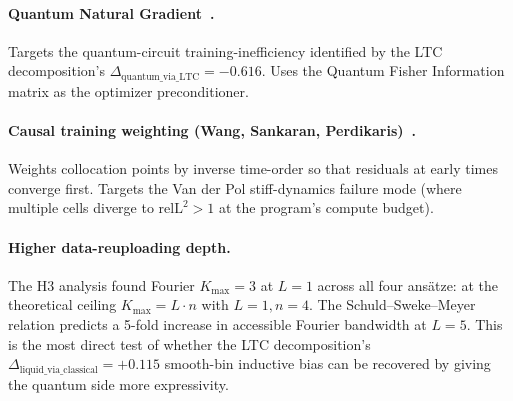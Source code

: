 \documentclass[%
  prx,
  amsmath,
  amssymb,
  aps,
  reprint,
  superscriptaddress,
  floatfix,
]{revtex4-2}
\newcommand{\relltwo}{\mathrm{relL}^2}
\newcommand{\vdp}{Van der Pol}
\begin{document}
\paragraph{Quantum Natural Gradient~\cite{stokes2020quantum}.}
Targets the quantum-circuit training-inefficiency identified by
the LTC decomposition's $\Delta_\mathrm{quantum\_via\_LTC} =
-0.616$. Uses the Quantum Fisher Information matrix as the
optimizer preconditioner.

\paragraph{Causal training weighting (Wang, Sankaran,
Perdikaris)~\cite{wang2022causality}.}
Weights collocation points by inverse time-order so that residuals
at early times converge first. Targets the \vdp{} stiff-dynamics
failure mode (where multiple cells diverge to
$\relltwo > 1$ at the program's compute budget).

\paragraph{Higher data-reuploading depth.}
The H3 analysis found Fourier $K_{\max} = 3$ at $L = 1$ across
all four ansätze: at the theoretical ceiling
$K_{\max} = L \cdot n$ with $L=1, n=4$. The
Schuld--Sweke--Meyer relation predicts a 5-fold increase
in accessible Fourier bandwidth at $L = 5$. This is the most
direct test of whether the LTC decomposition's
$\Delta_\mathrm{liquid\_via\_classical} = +0.115$ smooth-bin
inductive bias can be recovered by giving the quantum side more
expressivity.



\end{document}
